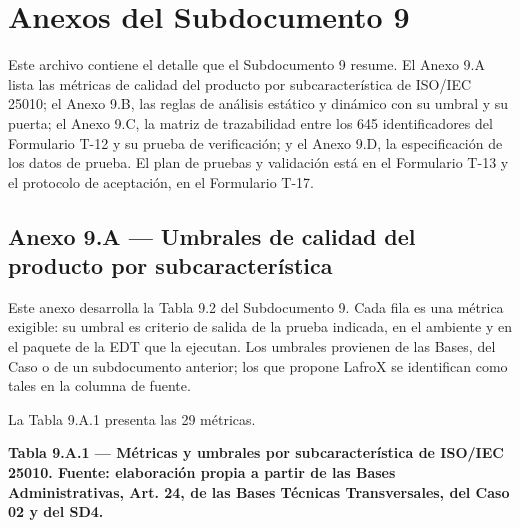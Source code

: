 \chapter{Anexos del Subdocumento 9}\label{cap:sd9-anexos}

Este archivo contiene el detalle que el Subdocumento 9 resume. El Anexo 9.A lista las métricas de calidad del producto por subcaracterística de ISO/IEC 25010; el Anexo 9.B, las reglas de análisis estático y dinámico con su umbral y su puerta; el Anexo 9.C, la matriz de trazabilidad entre los 645 identificadores del Formulario T-12 y su prueba de verificación; y el Anexo 9.D, la especificación de los datos de prueba. El plan de pruebas y validación está en el Formulario T-13 y el protocolo de aceptación, en el Formulario T-17.

\section*{Anexo 9.A — Umbrales de calidad del producto por subcaracterística}

Este anexo desarrolla la Tabla 9.2 del Subdocumento 9. Cada fila es una métrica exigible: su umbral es criterio de salida de la prueba indicada, en el ambiente y en el paquete de la EDT que la ejecutan. Los umbrales provienen de las Bases, del Caso o de un subdocumento anterior; los que propone LafroX se identifican como tales en la columna de fuente.

La Tabla 9.A.1 presenta las 29 métricas.

\textbf{Tabla 9.A.1 — Métricas y umbrales por subcaracterística de ISO/IEC 25010. Fuente: elaboración propia a partir de las Bases Administrativas, Art. 24, de las Bases Técnicas Transversales, del Caso 02 y del SD4.}

